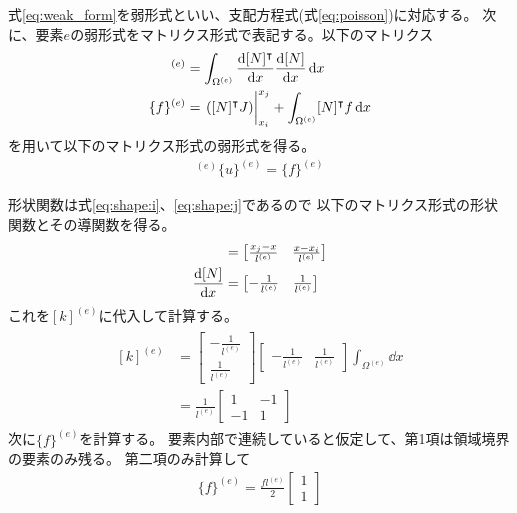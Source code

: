 \documentclass[paper=a4]{jlreq}
\begin{document}
式\eqref{eq:weak_form}を弱形式といい、支配方程式(式\eqref{eq:poisson})に対応する。
次に、要素$e$の弱形式をマトリクス形式で表記する。以下のマトリクス
\begin{align*}
    [k]^{(e)} &= \int_{\Omega^{(e)}} \dv{[N]^\intercal}{x} \dv{[N]}{x}\dd{x}\\
    \{f\}^{(e)} &= \eval{\qty([N]^\intercal J)}_{x_i}^{x_j} +\int_{\Omega^{(e)}} [N]^\intercal f\dd{x}
\end{align*}
を用いて以下のマトリクス形式の弱形式を得る。
\begin{align}
    [k]^{(e)}\{u\}^{(e)} =  \{f\}^{(e)}
    \label{eq:weak_form:mat}
\end{align}

形状関数は式\eqref{eq:shape:i}、\eqref{eq:shape:j}であるので
以下のマトリクス形式の形状関数とその導関数を得る。
\begin{align*}
    [N] &= 
    \begin{bmatrix}
        \frac{x_j -x}{l^{(e)}} &
        \frac{x - x_i}{l^{(e)}}
    \end{bmatrix}\\
    \dv{[N]}{x} &= 
    \begin{bmatrix}
        -\frac{1}{l^{(e)}} &
        \frac{1}{l^{(e)}}
    \end{bmatrix}\\
\end{align*}
これを$[k]^{(e)}$に代入して計算する。
\begin{align*}
    \begin{split}
        [k]^{(e)} &= 
        \begin{bmatrix}
            -\frac{1}{l^{(e)}} \\
            \frac{1}{l^{(e)}}
        \end{bmatrix}
        \begin{bmatrix}
            -\frac{1}{l^{(e)}} &
            \frac{1}{l^{(e)}}
        \end{bmatrix}        
        \int_{\Omega^{(e)}}\dd{x}\\
        &= \frac{1}{l^{(e)}}
        \begin{bmatrix}
            1 & -1\\
            -1 & 1
        \end{bmatrix}
    \end{split}
\end{align*}
次に$\{f\}^{(e)}$を計算する。
要素内部で連続していると仮定して、第1項は領域境界の要素のみ残る。
第二項のみ計算して
\begin{align}
    \{f\}^{(e)} = \frac{fl^{(e)}}{2}
    \begin{bmatrix}
        1 \\
        1
    \end{bmatrix}
\end{align}
\end{document}
